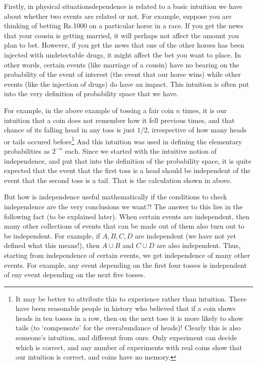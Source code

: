 \documentclass[preprint,  11pt]{amsart}
\begin{document}
Firstly, in physical situationsdependence is related to a basic intuition we have about whether two events are related or not. For example, suppose you are thinking of betting Rs.1000 on a particular horse in a race. If you get the news that your cousin is getting married, it will perhaps not affect the amount you plan to bet. However, if you get the news that one of the other horses has been injected with undetectable drugs, it might affect the bet you want to place. In other words, certain events (like marriage of a cousin) have no bearing on the probability of the event of interest (the event that our horse wins) while other events (like the injection of drugs) do have an impact. This intuition is often put into the very definition of probability space that we have.

For example, in the above example of tossing a fair coin $n$ times, it is our intuition that a coin does not remember how it fell previous times, and that chance of its falling head in any toss is just $1/2$, irrespective of how many heads or tails occured before\footnote{It may be better to attribute this to experience rather than intuition. There have been reasonable people in history who believed that if a coin shows heads in ten tosses in a row, then on the next toss it is more likely to show tails (to `compensate' for the overabundance of heads)! Clearly this is also someone's intuition, and different from ours. Only experiment can decide which is correct, and any number of experiments with real coins show that our intuition is correct, and coins have no memory.} And this intuition was used in defining the elementary probabilities as $2^{-n}$ each. Since we started with the intuitive notion of independence, and put that into the definition of the probability space, it is quite expected that the event that the first toss is a head should be independent of the event that the second toss is a tail. That is the calculation shown in above.

But how is independence useful mathematically if the conditions to check independence are the very conclusions we want?! The answer to this lies in the following fact (to be explained later). When certain events are independent, then many other collections of events that can be made out of them also turn out to be independent. For example, if $A,B,C,D$ are independent (we have not yet defined what this means!), then $A\cup B$ and $C\cup D$ are also independent. Thus, starting from independence of certain events, we get independence of many other events. For example, any event depending on the first four tosses is independent of eny event depending on the next five tosses.
\end{document}
